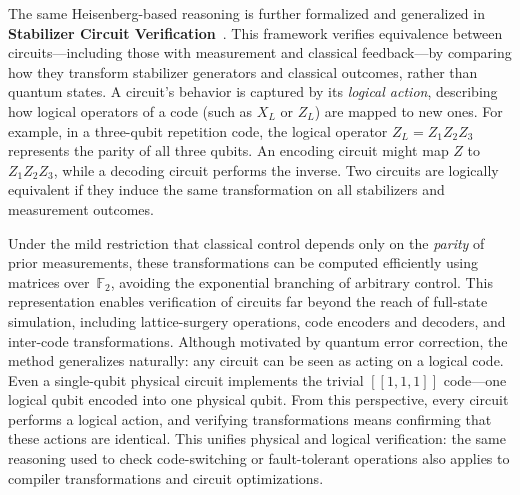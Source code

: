 \vspace{1em}

The same Heisenberg-based reasoning is further formalized and generalized in \textbf{Stabilizer Circuit Verification}~\cite{kliuchnikov2023stabilizer}.
This framework verifies equivalence between circuits—including those with measurement and classical feedback—by comparing how they transform stabilizer generators and classical outcomes, rather than quantum states.
A circuit’s behavior is captured by its \emph{logical action}, describing how logical operators of a code (such as $X_L$ or $Z_L$) are mapped to new ones.
For example, in a three-qubit repetition code, the logical operator $Z_L = Z_1Z_2Z_3$ represents the parity of all three qubits.
An encoding circuit might map $Z$ to $Z_1Z_2Z_3$, while a decoding circuit performs the inverse.
Two circuits are logically equivalent if they induce the same transformation on all stabilizers and measurement outcomes.

Under the mild restriction that classical control depends only on the \emph{parity} of prior measurements, these transformations can be computed efficiently using matrices over~$\mathbb{F}_2$, avoiding the exponential branching of arbitrary control.
This representation enables verification of circuits far beyond the reach of full-state simulation, including lattice-surgery operations, code encoders and decoders, and inter-code transformations.
Although motivated by quantum error correction, the method generalizes naturally: any circuit can be seen as acting on a logical code.
Even a single-qubit physical circuit implements the trivial $[[1,1,1]]$ code—one logical qubit encoded into one physical qubit.
From this perspective, every circuit performs a logical action, and verifying transformations means confirming that these actions are identical.
This unifies physical and logical verification: the same reasoning used to check code-switching or fault-tolerant operations also applies to compiler transformations and circuit optimizations.
